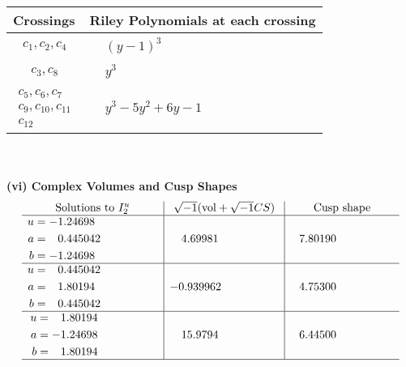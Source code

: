 \documentclass[1p]{elsarticle_modified}
\theoremstyle{definition}
\newcommand{\I}{\sqrt{-1}}
\begin{document}
\begin{tabular}{m{50pt}|m{274pt}}
Crossings & \hspace{64pt}Riley Polynomials at each crossing \\
\hline $$\begin{aligned}c_{1},c_{2},c_{4}\end{aligned}$$&$\begin{aligned}
&(y-1)^3
\end{aligned}$\\
\hline $$\begin{aligned}c_{3},c_{8}\end{aligned}$$&$\begin{aligned}
&y^3
\end{aligned}$\\
\hline $$\begin{aligned}c_{5},c_{6},c_{7}\\c_{9},c_{10},c_{11}\\c_{12}\end{aligned}$$&$\begin{aligned}
&y^3-5 y^2+6 y-1
\end{aligned}$\\
\hline
\end{tabular}\\~\\
\newpage\flushleft \textbf{(vi) Complex Volumes and Cusp Shapes}
$$\begin{array}{c|c|c}  
\text{Solutions to }I^u_{2}& \I (\text{vol} + \sqrt{-1}CS) & \text{Cusp shape}\\
 \hline 
\begin{aligned}
u &= -1.24698\phantom{ +0.000000I} \\
a &= \phantom{-}0.445042\phantom{ +0.000000I} \\
b &= -1.24698\phantom{ +0.000000I}\end{aligned}
 & \phantom{-}4.69981\phantom{ +0.000000I} & \phantom{-}7.80190\phantom{ +0.000000I} \\ \hline\begin{aligned}
u &= \phantom{-}0.445042\phantom{ +0.000000I} \\
a &= \phantom{-}1.80194\phantom{ +0.000000I} \\
b &= \phantom{-}0.445042\phantom{ +0.000000I}\end{aligned}
 & -0.939962\phantom{ +0.000000I} & \phantom{-}4.75300\phantom{ +0.000000I} \\ \hline\begin{aligned}
u &= \phantom{-}1.80194\phantom{ +0.000000I} \\
a &= -1.24698\phantom{ +0.000000I} \\
b &= \phantom{-}1.80194\phantom{ +0.000000I}\end{aligned}
 & \phantom{-}15.9794\phantom{ +0.000000I} & \phantom{-}6.44500\phantom{ +0.000000I}\\
 \hline 
 \end{array}$$\newpage
\end{document}
